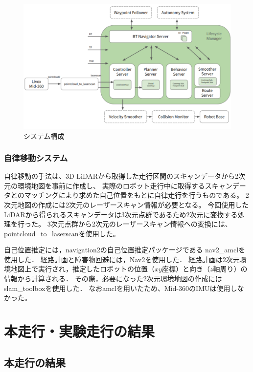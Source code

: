 \documentclass[twocolumn,9pt]{jsproceedings}
\begin{document}
\begin{figure}[h]
  \begin{center}
    \includegraphics[width=1.0\linewidth]{figs/shinsotu_system_diagram.pdf}
    \caption{システム構成 \cite{nav2_docs}}
    \label{fig:shinsotu_system_diagram}
  \end{center}
\end{figure}


\subsubsection{自律移動システム}

自律移動の手法は、3D LiDARから取得した走行区間のスキャンデータから2次元の環境地図を事前に作成し、
実際のロボット走行中に取得するスキャンデータとのマッチングにより求めた自己位置をもとに自律走行を行うものである。
2次元地図の作成には2次元のレーザースキャン情報が必要となる。
今回使用したLiDARから得られるスキャンデータは3次元点群であるため2次元に変換する処理を行った。
3次元点群から2次元のレーザースキャン情報への変換には、pointcloud\_to\_laserscan\cite{pcl_lsc}を使用した。

自己位置推定には，navigation2の自己位置推定パッケージである
nav2\_amclを使用した\cite{nav2_amcl}．
経路計画と障害物回避には，Nav2を使用した\cite{nav2}．
経路計画は2次元環境地図上で実行され，推定したロボットの位置（$xy$座標）と向き（$z$軸周り）の情報から計算される．
その際，必要になった2次元環境地図の作成にはslam\_toolbox\cite{slam_toolbox}を使用した．
なおamclを用いたため、Mid-360のIMUは使用しなかった。

\section{本走行・実験走行の結果}
\subsection{本走行の結果}
\end{document}
